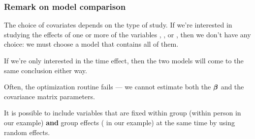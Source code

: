 \documentclass{beamer}
\begin{document}
\begin{frame}
\frametitle{Remark on model comparison}
\bi
\item The choice of covariates depends on the type of study. If we're interested in studying the effects of one or more of the variables , ,  or , then we don't have any choice: we must choose a model that contains all of them. 
\item If we're only interested in the time effect, then the two models will come to the same conclusion either way.
 \item Often, the optimization routine fails --- we cannot estimate both the $\boldsymbol {\beta}$ and the covariance matrix parameters.
\item It is possible to include variables that are fixed within group (within person in our example) \textbf{and} group effects ( in our example) at the same time by using \alert{random effects}.
\ei
\end{frame}
% 
% 
% 
% 
\end{document}
